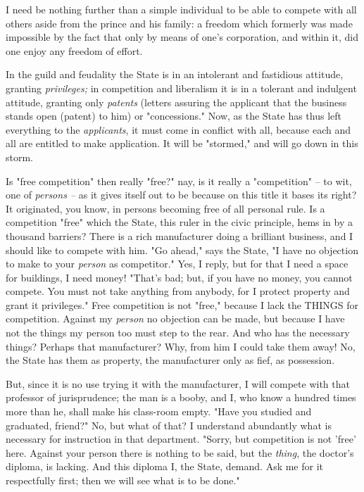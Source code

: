 \documentclass[a4paper]{book}
\begin{document}
I need be nothing further than a simple individual to be able to compete with 
all others aside from the prince and his family: a freedom which formerly was 
made impossible by the fact that only by means of one's corporation, and 
within it, did one enjoy any freedom of effort.

In the guild and feudality the State is in an intolerant and fastidious 
attitude, granting \textit{privileges;} in competition and liberalism it is in 
a tolerant and indulgent attitude, granting only \textit{patents} (letters 
assuring the applicant that the business stands open (patent) to him) or 
"{}concessions."{} Now, as the State has thus left everything to the 
\textit{applicants}, it must come in conflict with all, because each and all 
are entitled to make application. It will be "{}stormed,"{} and will go down 
in this storm.

Is "{}free competition"{} then really "{}free?"{} nay, is it really a 
"{}competition"{} -- to wit, one of \textit{persons --} as it gives itself out 
to be because on this title it bases its right? It originated, you know, in 
persons becoming free of all personal rule. Is a competition "{}free"{} which 
the State, this ruler in the civic principle, hems in by a thousand barriers? 
There is a rich manufacturer doing a brilliant business, and I should like to 
compete with him. "{}Go ahead,"{} says the State, "{}I have no objection to 
make to your \textit{person} as competitor."{} Yes, I reply, but for that I 
need a space for buildings, I need money! "{}That's bad; but, if you have no 
money, you cannot compete. You must not take anything from anybody, for I 
protect property and grant it privileges."{} Free competition is not 
"{}free,"{} because I lack the THINGS for competition. Against my 
\textit{person} no objection can be made, but because I have not the things my 
person too must step to the rear. And who has the necessary things? Perhaps 
that manufacturer? Why, from him I could take them away! No, the State has 
them as property, the manufacturer only as fief, as possession.

But, since it is no use trying it with the manufacturer, I will compete with 
that professor of jurisprudence; the man is a booby, and I, who know a hundred 
times more than he, shall make his class-room empty. "{}Have you studied and 
graduated, friend?"{} No, but what of that? I understand abundantly what is 
necessary for instruction in that department. "{}Sorry, but competition is not 
'free' here. Against your person there is nothing to be said, but the 
\textit{thing}, the doctor's diploma, is lacking. And this diploma I, the 
State, demand. Ask me for it respectfully first; then we will see what is to 
be done."{}
\end{document}
